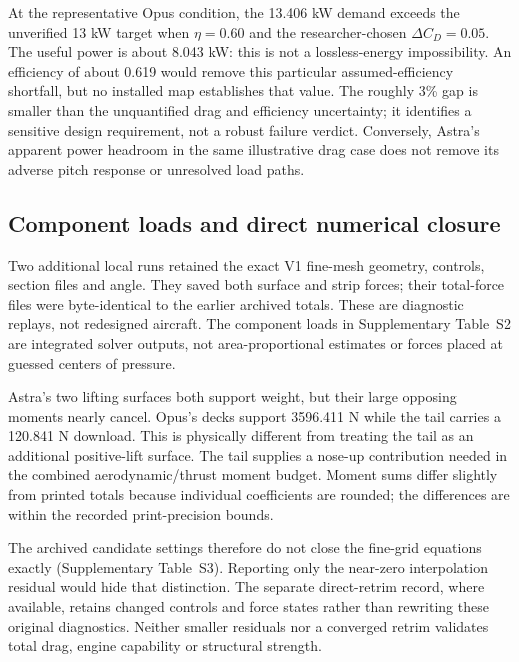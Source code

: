 \documentclass[10pt,letterpaper]{article}
\begin{document}
At the representative Opus condition, the 13.406 kW demand exceeds the unverified 13 kW target when $\eta=0.60$ and the researcher-chosen $\Delta C_D=0.05$. The useful power is about 8.043 kW: this is not a lossless-energy impossibility. An efficiency of about 0.619 would remove this particular assumed-efficiency shortfall, but no installed map establishes that value. The roughly 3\% gap is smaller than the unquantified drag and efficiency uncertainty; it identifies a sensitive design requirement, not a robust failure verdict. Conversely, Astra's apparent power headroom in the same illustrative drag case does not remove its adverse pitch response or unresolved load paths.

\subsection{Component loads and direct numerical closure}
Two additional local runs retained the exact V1 fine-mesh geometry, controls, section files and angle. They saved both surface and strip forces; their total-force files were byte-identical to the earlier archived totals. These are diagnostic replays, not redesigned aircraft. The component loads in Supplementary Table~S2 are integrated solver outputs, not area-proportional estimates or forces placed at guessed centers of pressure.



Astra's two lifting surfaces both support weight, but their large opposing moments nearly cancel. Opus's decks support 3596.411 N while the tail carries a 120.841 N download. This is physically different from treating the tail as an additional positive-lift surface. The tail supplies a nose-up contribution needed in the combined aerodynamic/thrust moment budget. Moment sums differ slightly from printed totals because individual coefficients are rounded; the differences are within the recorded print-precision bounds.



The archived candidate settings therefore do not close the fine-grid equations exactly (Supplementary Table~S3). Reporting only the near-zero interpolation residual would hide that distinction. The separate direct-retrim record, where available, retains changed controls and force states rather than rewriting these original diagnostics. Neither smaller residuals nor a converged retrim validates total drag, engine capability or structural strength.
\end{document}
